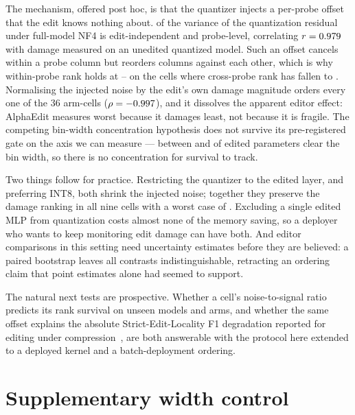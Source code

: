\documentclass[preprint,12pt]{elsarticle}
\begin{document}
The mechanism, offered post hoc, is that the quantizer injects a per-probe offset that
the edit knows nothing about. \pAddShareNfFM{} of the variance of the quantization
residual under full-model NF4 is edit-independent and probe-level, correlating
$r=0.979{}$ with damage measured on an unedited quantized model. Such an offset
cancels within a probe column but reorders columns against each other, which is why
within-probe rank holds at \pWithinNfFMQOneRome{}--\pWithinNfFMLOneRome{} on the cells
where cross-probe rank has fallen to \pFlatNfFMQOneRome{}. Normalising the injected
noise by the edit's own damage magnitude orders every one of the 36 arm-cells
($\rho=-0.997{}$), and it dissolves the apparent editor effect: AlphaEdit measures
worst because it damages least, not because it is fragile. The competing bin-width
concentration hypothesis does not survive its pre-registered gate on the axis we can measure --- between
\pKthreeFaboveMin{} and \pKthreeFaboveMax{} of edited parameters clear the bin width, so
there is no concentration for survival to track.

Two things follow for practice. Restricting the quantizer to the edited layer, and
preferring INT8, both shrink the injected noise; together they preserve the damage
ranking in all nine cells with a worst case of \pMinFlatIntEL{}. Excluding a single
edited MLP from quantization costs almost none of the memory saving, so a deployer who
wants to keep monitoring edit damage can have both. And editor comparisons in this
setting need uncertainty estimates before they are believed: a paired bootstrap leaves
all \pBootNContrasts{} contrasts indistinguishable, retracting an ordering claim that
point estimates alone had seemed to support.

The natural next tests are prospective. Whether a cell's noise-to-signal ratio predicts
its rank survival on unseen models and arms, and whether the same offset explains the
absolute Strict-Edit-Locality F1 degradation reported for editing under
compression~\cite{composable2024}, are both answerable with the protocol here extended
to a deployed kernel and a batch-deployment ordering.

\appendix
\section{Supplementary width control}
\label{app:width-control}
\setcounter{figure}{0}
\renewcommand{\thefigure}{A.\arabic{figure}}
\renewcommand{\theHfigure}{appendix.A.\arabic{figure}}
\end{document}
